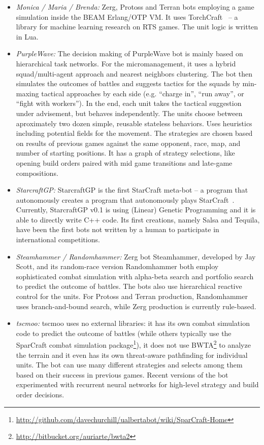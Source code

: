 \begin{itemize}
  \item {\em  Monica / Maria / Brenda:} Zerg, Protoss and Terran bots employing a game simulation inside the BEAM Erlang/OTP VM. It uses TorchCraft~\cite{synnaeve2016torchcraft}  -- a library for machine learning research on RTS games. The unit logic is written in Lua.
  
  \item {\em PurpleWave:} The decision making of PurpleWave bot is mainly based on hierarchical task networks. For the micromanagement, it uses a hybrid squad/multi-agent approach and nearest neighbors clustering. The bot then simulates the outcomes of battles and suggests tactics for the squads by min-maxing tactical approaches by each side (e.g. ``charge in'', ``run away'', or ``fight with workers''). In the end, each unit takes the tactical suggestion under advisement, but behaves independently. The units choose between aproximately two dozen simple, reusable stateless behaviors. Uses heuristics including potential fields for the movement. The strategies are chosen based on results of previous games against the same opponent, race, map, and number of starting positions. It has a graph of strategy selections, like opening build orders paired with mid game transitions and late-game compositions.
  
  \item {\em StarcraftGP:} StarcraftGP is the first StarCraft meta-bot -- a program that autonomously creates a program that autonomously plays StarCraft~\cite{garcia2015towards}. Currently, StarcraftGP v0.1 is using (Linear) Genetic Programming and it is able to directly write C++ code. Its first creations, namely Salsa and Tequila, have been the first bots not written by a human to participate in international competitions.

  \item {\em Steamhammer / Randomhammer:} Zerg bot Steamhammer, developed by Jay Scott, and its random-race version Randomhammer both employ sophisticated combat simulation with alpha-beta search and portfolio search to predict the outcome of battles. The bots also use hierarchical reactive control for the units. For Protoss and Terran production, Randomhammer uses branch-and-bound search, while Zerg production is currently rule-based.

  \item {\em tscmoo:} tscmoo uses no external libraries: it has its own combat simulation code to predict the outcome of battles (while others typically use the SparCraft combat simulation package\footnote{\url{http://github.com/davechurchill/ualbertabot/wiki/SparCraft-Home}}), it does not use BWTA\footnote{\url{http://bitbucket.org/auriarte/bwta2}} to analyze the terrain and it even has its own threat-aware pathfinding for individual units. The bot can use many different strategies and selects among them based on their success in previous games. Recent versions of the bot experimented with recurrent neural networks for high-level strategy and build order decisions.
  

\end{itemize}
